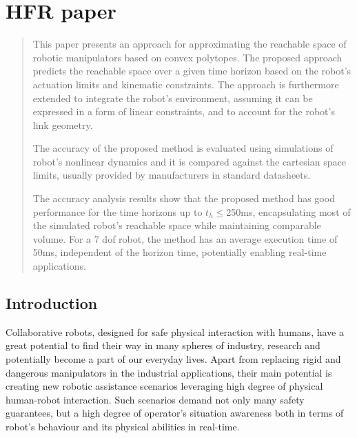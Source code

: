 
\chapter{HFR paper}

\begin{abstract}

This paper presents an approach for approximating the reachable space of robotic manipulators based on convex polytopes. The proposed approach predicts the reachable space over a given time horizon based on the robot's actuation limits and kinematic constraints. The approach is furthermore extended to integrate the robot's environment, assuming it can be expressed in a form of linear constraints, and to account for the robot's link geometry.

The accuracy of the proposed method is evaluated using simulations of robot's nonlinear dynamics and it is compared against the cartesian space limits, usually provided by manufacturers in standard datasheets.

The accuracy analysis results show that the proposed method has good performance for the time horizons up to $t_h\!\leq$250ms, encapsulating most of the simulated robot's reachable space while maintaining comparable volume. For a 7 dof robot, the method has an average execution time of 50ms, independent of the horizon time, potentially enabling real-time applications.


\end{abstract}
%
%
%
\section{Introduction}
\vspace{-0.3cm}

Collaborative robots, designed for safe physical interaction with humans, have a great potential to find their way in many spheres of industry, research and potentially become a part of our everyday lives. Apart from replacing rigid and dangerous manipulators in the industrial applications, their main potential is creating new robotic assistance scenarios leveraging high degree of physical human-robot interaction. Such scenarios demand not only many safety guarantees, but a high degree of operator's situation awareness both in terms of robot's behaviour and its physical abilities in real-time.  

